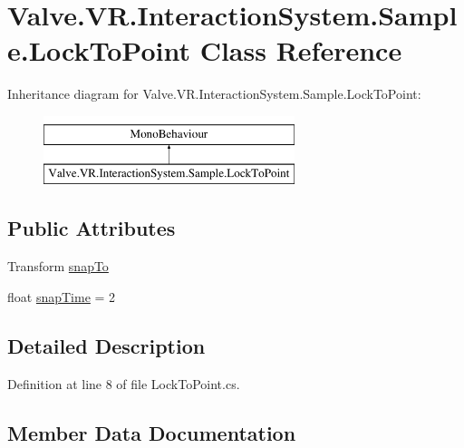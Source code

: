\hypertarget{class_valve_1_1_v_r_1_1_interaction_system_1_1_sample_1_1_lock_to_point}{}\section{Valve.\+V\+R.\+Interaction\+System.\+Sample.\+Lock\+To\+Point Class Reference}
\label{class_valve_1_1_v_r_1_1_interaction_system_1_1_sample_1_1_lock_to_point}
Inheritance diagram for Valve.\+V\+R.\+Interaction\+System.\+Sample.\+Lock\+To\+Point\+:\begin{figure}[H]
\begin{center}
\leavevmode
\includegraphics[height=2.000000cm]{class_valve_1_1_v_r_1_1_interaction_system_1_1_sample_1_1_lock_to_point}
\end{center}
\end{figure}
\subsection*{Public Attributes}
\begin{DoxyCompactItemize}
\item 
Transform \mbox{\hyperlink{class_valve_1_1_v_r_1_1_interaction_system_1_1_sample_1_1_lock_to_point_a84d46d3d4057f048cc6ebdd0beeae283}{snap\+To}}
\item 
float \mbox{\hyperlink{class_valve_1_1_v_r_1_1_interaction_system_1_1_sample_1_1_lock_to_point_a043c739f8b07a92b2ca390b71f46f5e9}{snap\+Time}} = 2
\end{DoxyCompactItemize}


\subsection{Detailed Description}


Definition at line 8 of file Lock\+To\+Point.\+cs.



\subsection{Member Data Documentation}
\mbox{\label{class_valve_1_1_v_r_1_1_interaction_system_1_1_sample_1_1_lock_to_point_a043c739f8b07a92b2ca390b71f46f5e9}} 
